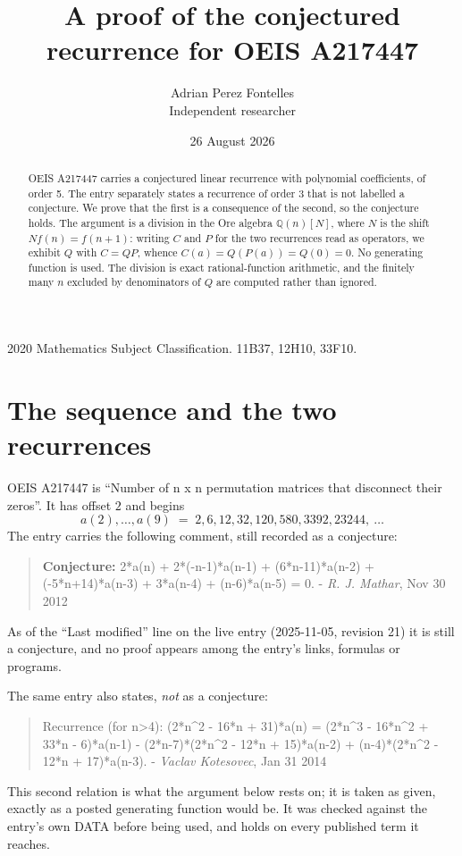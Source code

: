 \documentclass[11pt,a4paper]{article}
\title{A proof of the conjectured recurrence for OEIS A217447}
\author{Adrian Perez Fontelles\\ \small Independent researcher}
\date{26 August 2026}
\theoremstyle{plain}
\theoremstyle{definition}
\begin{document}
\maketitle

\begin{abstract}
OEIS A217447 carries a conjectured linear recurrence with polynomial coefficients, of
order 5. The entry separately states a recurrence of order 3 that is not
labelled a conjecture. We prove that the first is a consequence of the second, so the
conjecture holds. The argument is a division in the Ore algebra
$\mathbb{Q}(n)[N]$, where $N$ is the shift $Nf(n)=f(n+1)$: writing $C$ and $P$ for the two
recurrences read as operators, we exhibit $Q$ with $C=QP$, whence
$C(a)=Q(P(a))=Q(0)=0$. No generating function is used. The division is exact
rational-function arithmetic, and the finitely many $n$ excluded by denominators of $Q$
are computed rather than ignored.
\end{abstract}

\noindent\small 2020 Mathematics Subject Classification. 11B37, 12H10, 33F10.\normalsize

\section{The sequence and the two recurrences}

OEIS A217447 is ``Number of n x n permutation matrices that disconnect their zeros''. It has offset $2$ and begins
\[
a(2),\dots,a(9)\;=\;2, 6, 12, 32, 120, 580, 3392, 23244,\ \dots
\]
The entry carries the following comment, still recorded as a conjecture:
\begin{quote}\small
\textbf{Conjecture:} 2*a(n) + 2*(-n-1)*a(n-1) + (6*n-11)*a(n-2) + (-5*n+14)*a(n-3) + 3*a(n-4) + (n-6)*a(n-5) = 0. - \emph{R. J. Mathar}, Nov 30 2012
\end{quote}
As of the ``Last modified'' line on the live entry (2025-11-05, revision 21) it is still
a conjecture, and no proof appears among the entry's links, formulas or programs.

The same entry also states, \emph{not} as a conjecture:
\begin{quote}\small
Recurrence (for n>4): (2*n\^{}2 - 16*n + 31)*a(n) = (2*n\^{}3 - 16*n\^{}2 + 33*n - 6)*a(n-1) - (2*n-7)*(2*n\^{}2 - 12*n + 15)*a(n-2) + (n-4)*(2*n\^{}2 - 12*n + 17)*a(n-3). - \emph{Vaclav Kotesovec}, Jan 31 2014
\end{quote}
This second relation is what the argument below rests on; it is taken as given, exactly as
a posted generating function would be. It was checked against the entry's own DATA before
being used, and holds on every published term it reaches.
\end{document}
